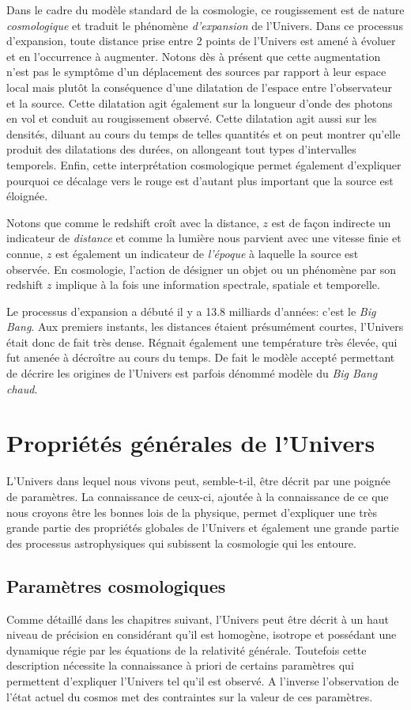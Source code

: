 Dans le cadre du modèle standard de la cosmologie, ce rougissement est de nature \textit{cosmologique} et traduit le phénomène \textit{d'expansion} de l'Univers. Dans ce processus d'expansion, toute distance prise entre 2 points de l'Univers est amené à évoluer et en l'occurrence à augmenter. Notons dès à présent que cette augmentation n'est pas le symptôme d'un déplacement des sources par rapport à leur espace local mais plutôt la conséquence d'une dilatation de l'espace entre l'observateur et la source. Cette dilatation agit également sur la longueur d'onde des photons en vol et conduit au rougissement observé. Cette dilatation agit aussi sur les densités, diluant au cours du temps de telles quantités et on peut montrer qu'elle produit des dilatations des durées, on allongeant tout types d'intervalles temporels. Enfin, cette interprétation cosmologique permet également d'expliquer pourquoi ce décalage vers le rouge est d'autant plus important que la source est éloignée.

Notons que comme le redshift croît avec la distance, $z$ est de façon indirecte un indicateur de \textit{distance} et comme la lumière nous parvient avec une vitesse finie et connue, $z$ est également un indicateur de \textit{l'époque} à laquelle la source est observée. En cosmologie, l'action de désigner un objet ou un phénomène par son redshift $z$ implique à la fois une information spectrale, spatiale et temporelle.

Le processus d'expansion a débuté il y a 13.8 milliards d'années: c'est le \textit{Big Bang}. Aux premiers instants, les distances étaient présumément courtes, l'Univers était donc de fait très dense. Régnait également une température très élevée, qui fut amenée à décroître au cours du temps. De fait le modèle accepté permettant de décrire les origines de l'Univers est parfois dénommé modèle du \textit{Big Bang chaud}.

\section{Propriétés générales de l'Univers}
L'Univers dans lequel nous vivons peut, semble-t-il, être décrit par une poignée de paramètres. La connaissance de ceux-ci, ajoutée à la connaissance de ce que nous croyons être les bonnes lois de la physique, permet d'expliquer une très grande partie des propriétés globales de l'Univers et également une grande partie des processus astrophysiques qui subissent la cosmologie qui les entoure.  

\subsection{Paramètres cosmologiques}
Comme détaillé dans les chapitres suivant, l'Univers peut être décrit à un haut niveau de précision en considérant qu'il est homogène, isotrope et possédant une dynamique régie par les équations de la relativité générale. Toutefois cette description nécessite la connaissance à priori de certains paramètres qui permettent d'expliquer l'Univers tel qu'il est observé. A l'inverse l'observation de l'état actuel du cosmos met des contraintes sur la valeur de ces paramètres.

